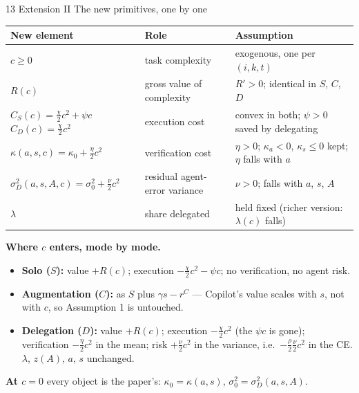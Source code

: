 \documentclass[aspectratio=169,11pt]{beamer}
\begin{document}
\begin{frame}{13 \textperiodcentered{} Extension II \textperiodcentered{} The new primitives, one by one}
  \footnotesize
  \begin{tabular}{@{}p{4.1cm}p{2.9cm}p{5.6cm}@{}}
    \toprule
    New element & Role & Assumption \\
    \midrule
    $c\ge 0$ & task complexity & exogenous, one per $(i,k,t)$ \\
    $R(c)$ & gross value of complexity & $R'>0$; identical in $S$, $C$, $D$ \\
    $C_S(c)=\tfrac{\chi}{2}c^2+\psi c$\newline $C_D(c)=\tfrac{\chi}{2}c^2$ & execution cost & convex in both; $\psi>0$ saved by delegating \\
    $\kappa(a,s,c)=\kappa_0+\tfrac{\eta}{2}c^2$ & verification cost & $\eta>0$; $\kappa_a<0$, $\kappa_s\le 0$ kept; $\eta$ falls with $a$ \\
    $\sigma_D^2(a,s,A,c)=\sigma_0^2+\tfrac{\nu}{2}c^2$ & residual agent-error variance & $\nu>0$; falls with $a$, $s$, $A$ \\
    $\lambda$ & share delegated & held fixed (richer version: $\lambda(c)$ falls) \\
    \bottomrule
  \end{tabular}

  \smallskip
  \textbf{Where $c$ enters, mode by mode.}
  \begin{itemize}
    \item \textbf{Solo ($S$):} value $+R(c)$; execution $-\tfrac{\chi}{2}c^2-\psi c$; no verification, no agent risk.
    \item \textbf{Augmentation ($C$):} as $S$ plus $\gamma s-r^C$ --- Copilot's value scales with $s$, not with
      $c$, so Assumption 1 is untouched.
    \item \textbf{Delegation ($D$):} value $+R(c)$; execution $-\tfrac{\chi}{2}c^2$ (the $\psi c$ is gone);
      verification $-\tfrac{\eta}{2}c^2$ in the mean; risk $+\tfrac{\nu}{2}c^2$ in the variance, i.e.\
      $-\tfrac{\rho}{2}\tfrac{\nu}{2}c^2$ in the CE. $\lambda$, $z(A)$, $a$, $s$ unchanged.
  \end{itemize}
  \textbf{At $c=0$} every object is the paper's: $\kappa_0=\kappa(a,s)$, $\sigma_0^2=\sigma_D^2(a,s,A)$.
\end{frame}
\end{document}
